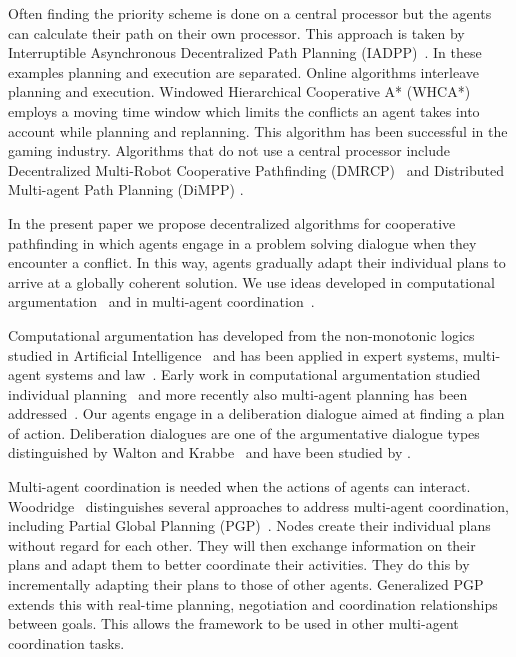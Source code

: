 Often finding the priority scheme is done on a central 
processor but the agents can calculate their path on their own processor. This 
approach is taken by Interruptible Asynchronous Decentralized Path Planning 
(IADPP)~\cite{cap2012}.
In these examples planning and execution are separated. Online algorithms 
interleave planning and execution. Windowed Hierarchical Cooperative A* 
(WHCA*)~\cite{silver2005} employs a moving time window which limits the 
conflicts an agent takes into account while planning and replanning. This 
algorithm has been successful in the gaming industry.
Algorithms that do not use a central processor include Decentralized 
Multi-Robot Cooperative Pathfinding (DMRCP)~\cite{wei2016} and Distributed 
Multi-agent Path Planning (DiMPP) \cite{chouhan2017}.

In the present paper we propose decentralized algorithms for cooperative 
pathfinding in which agents engage in a problem solving dialogue when they 
encounter a conflict. In this way, agents gradually adapt their individual 
plans to arrive at a globally coherent solution. We use ideas developed in 
computational argumentation~\cite{modgil2013} and in multi-agent 
coordination~\cite[pp.~202--204]{woodridge2009}.

Computational argumentation has developed from the non-monotonic logics studied 
in Artificial Intelligence~\cite{dung1995} and has been applied in expert 
systems, multi-agent systems and law~\cite{vaneemeren2014}. Early work in 
computational argumentation studied individual planning~\cite{pollock1995} and 
more recently also multi-agent planning has been 
addressed~\cite{ferrando2012,pardo2011}. Our agents engage in a deliberation 
dialogue aimed at finding a plan of action. Deliberation dialogues are one of 
the argumentative dialogue types distinguished by Walton and 
Krabbe~ and have been studied by 
\cite{mcburney2007,walton2014,dunin-keplicz2011}.

Multi-agent coordination is needed when the actions of agents can interact. 
Woodridge~ distinguishes several 
approaches to address multi-agent coordination, including Partial Global 
Planning (PGP)~\cite{durfee1991}. Nodes create their individual plans without 
regard for each other. They will then exchange information on their plans and
adapt them to better coordinate their activities. They do this by incrementally 
adapting their plans to those of other agents.
Generalized PGP \cite{decker1992} extends this with real-time planning, 
negotiation and coordination relationships between goals. This allows the 
framework to be used in other multi-agent coordination tasks.

